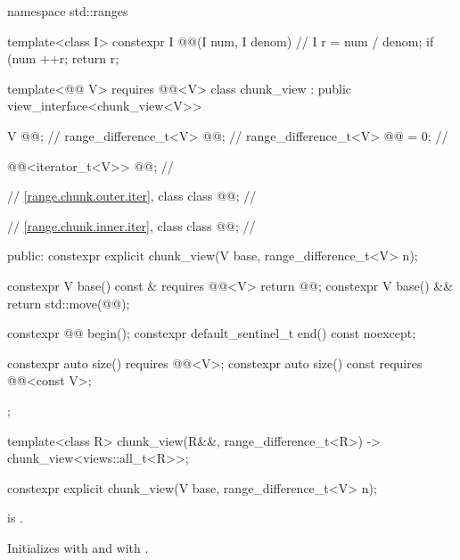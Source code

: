 %
%
%
\begin{codeblock}
namespace std::ranges {
  template<class I>
  constexpr I @@(I num, I denom) {                  // \expos
    I r = num / denom;
    if (num %
      ++r;
    return r;
  }

  template<@@ V>
    requires @@<V>
  class chunk_view : public view_interface<chunk_view<V>> {
    V @@;                                              // \expos
    range_difference_t<V> @@;                             // \expos
    range_difference_t<V> @@ = 0;                 // \expos

    @@<iterator_t<V>> @@;       // \expos

    // \ref{range.chunk.outer.iter}, class 
    class @@;                                 // \expos

    // \ref{range.chunk.inner.iter}, class 
    class @@;                                 // \expos

  public:
    constexpr explicit chunk_view(V base, range_difference_t<V> n);

    constexpr V base() const & requires @@<V> { return @@; }
    constexpr V base() && { return std::move(@@); }

    constexpr @@ begin();
    constexpr default_sentinel_t end() const noexcept;

    constexpr auto size() requires @@<V>;
    constexpr auto size() const requires @@<const V>;
  };

  template<class R>
    chunk_view(R&&, range_difference_t<R>) -> chunk_view<views::all_t<R>>;
}
\end{codeblock}

\begin{itemdecl}
constexpr explicit chunk_view(V base, range_difference_t<V> n);
\end{itemdecl}

\begin{itemdescr}
\pnum
\expects
{} is .

\pnum
\effects
Initializes  with  and
 with .
\end{itemdescr}

